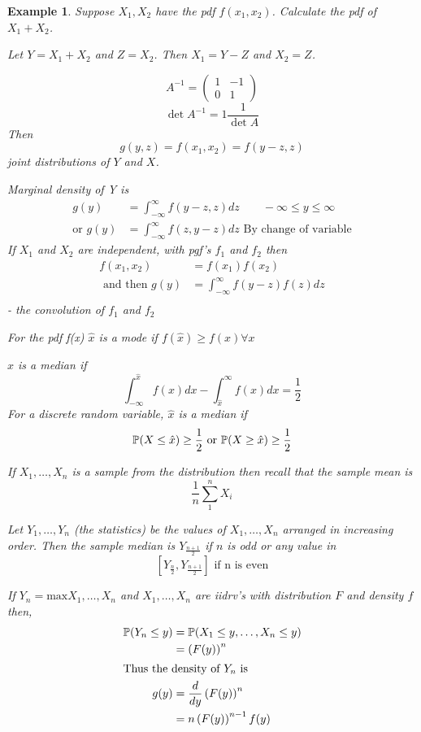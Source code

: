 \documentclass{notes}
\theoremstyle{plain}
\newtheorem*{example}{Example}
\newcommand{\bP}{\mathbb{P}}
\newcommand{\prob}[1]{\bP \negthinspace\left(#1\right)}
\begin{document}
\begin{example}
Suppose $X_1,X_2$ have the pdf $f(x_1,x_2)$. Calculate the pdf of $X_1
+X_2$.

Let $ Y= X_1 + X_2$ and $Z=X_2$. Then $X_1= Y-Z$ and $X_2 =Z$.

\begin{equation}
A^{-1} = 
\begin{pmatrix}
1&-1\\
0&1
\end{pmatrix}
\end{equation}
\[
\det{A^{-1}} =1 \frac{1}{\det{A}}
\]
Then
\[
g(y,z) = f(x_1,x_2) = f(y-z,z)
\]
joint distributions of $Y$ and $X$.

Marginal density of Y is
\begin{align*}
g(y) &=\int_{-\infty}^{\infty} f(y-z,z)dz \qquad -\infty \le y \le
\infty\\
\text{or }g(y) &=\int_{-\infty}^{\infty} f(z,y-z)dz\text{ By change of variable}
\end{align*}
If $X_1$ and $X_2$ are independent, with pgf's $f_1$ and $f_2$ then
\begin{align*}
f(x_1,x_2) &= f(x_1)f(x_2)\\
\text{ and then } g(y) &= \int_{-\infty}^{\infty}f(y-z)f(z)dz\\
\end{align*}
- the convolution of  $f_1$ and $f_2$

\vspace{2in}

For the pdf f(x) $\hat{x}$ is a mode if $f(\hat{x}) \ge f(x) \forall
x$

$\hat{x}$  is a median if
\[
\int_{-\infty}^{\hat{x}}f(x)dx - \int_{\hat{x}}^{\infty}f(x)dx =\frac{1}{2}
\]
For a discrete random variable, $\hat{x}$ is a median if
\[
\prob{X \leq \hat{x}} \geq \frac{1}{2} \text{ or }
\prob{X \geq \hat{x}} \geq \frac{1}{2}
\]

If $X_1,\dots,X_n$ is a sample from the distribution then recall that
the sample mean is
\[
\frac{1}{n} \sum_1^nX_i
\]

Let $Y_1,\dots,Y_n$ (the \emph{statistics}) be the values of
$X_1,\dots,X_n$ arranged in increasing order. Then the sample median
is $Y_{\frac{n+1}{2}}$ if $n$ is odd or any value in
\[
\left[Y_{\frac{n}{2}}, Y_{\frac{n+1}{2}} \right] \text{ if n is even}
\]

If $Y_n = \text{max}{X_1,\dots,X_n}$ and $X_1,\dots,X_n$ are iidrv's
with distribution $F$ and density $f$ then,
\begin{align*}
\prob{Y_n \leq y} &= \prob{X_1 \leq y,\dots, X_n \leq y}\\
&= \left(F(y)\right)^n\\
\intertext{Thus the density of $Y_n$ is}
g(y) &= \frac{d}{dy} \left(F(y)\right)^n\\
&= n\left(F(y)\right)^{n-1}f(y)
\end{align*}


\end{example}
\end{document}
